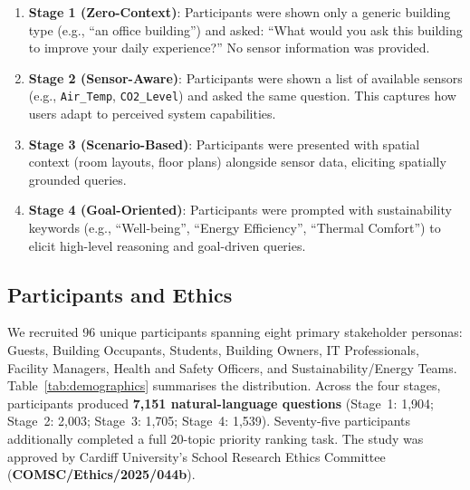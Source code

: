 \documentclass[acmsmall]{acmart}
\begin{document}
\begin{enumerate}
    \item \textbf{Stage 1 (Zero-Context)}: Participants were shown only a generic building type (e.g., ``an office building'') and asked: ``What would you ask this building to improve your daily experience?'' No sensor information was provided.
    \item \textbf{Stage 2 (Sensor-Aware)}: Participants were shown a list of available sensors (e.g., \texttt{Air\_Temp}, \texttt{CO2\_Level}) and asked the same question. This captures how users adapt to perceived system capabilities.
    \item \textbf{Stage 3 (Scenario-Based)}: Participants were presented with spatial context (room layouts, floor plans) alongside sensor data, eliciting spatially grounded queries.
    \item \textbf{Stage 4 (Goal-Oriented)}: Participants were prompted with sustainability keywords (e.g., ``Well-being'', ``Energy Efficiency'', ``Thermal Comfort'') to elicit high-level reasoning and goal-driven queries.
\end{enumerate}

\subsection{Participants and Ethics}
\label{sec:participants}

We recruited 96 unique participants spanning eight primary stakeholder personas: Guests, Building Occupants, Students, Building Owners, IT Professionals, Facility Managers, Health and Safety Officers, and Sustainability/Energy Teams. Table~\ref{tab:demographics} summarises the distribution. Across the four stages, participants produced \textbf{7{,}151 natural-language questions} (Stage~1: 1{,}904; Stage~2: 2{,}003; Stage~3: 1{,}705; Stage~4: 1{,}539). Seventy-five participants additionally completed a full 20-topic priority ranking task. The study was approved by Cardiff University's School Research Ethics Committee (\textbf{COMSC/Ethics/2025/044b}).
\end{document}

